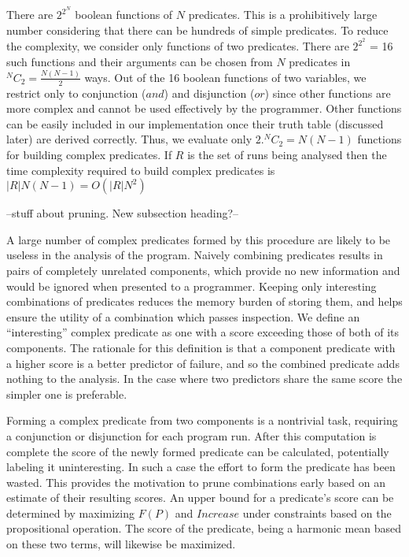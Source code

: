 There are $2^{2^N}$ boolean functions of $N$ predicates.  This is a prohibitively large number considering that there can be hundreds of simple predicates.  To reduce the complexity, we consider only functions of two predicates.  There are $2^{2^2}$ = 16 such functions and their arguments can be chosen from $N$ predicates in $^NC_2 = \frac{N(N-1)}{2}$ ways.  Out of the 16 boolean functions of two variables, we restrict only to conjunction ($and$) and disjunction ($or$) since other functions are more complex and cannot be used effectively by the programmer.  Other functions can be easily included in our implementation once their truth table (discussed later) are derived correctly.  Thus, we evaluate only $2. ^NC_2 = N(N-1)$ functions for building complex predicates.  If $R$ is the set of runs being analysed then the time complexity required to build complex predicates is $|R|N(N-1) = O(|R|N^2)$

--stuff about pruning.  New subsection heading?--

A large number of complex predicates formed by this procedure are likely to be useless in the analysis of the program.  Naively combining predicates results in pairs of completely unrelated components, which provide no new information and would be ignored when presented to a programmer.  Keeping only interesting combinations of predicates reduces the memory burden of storing them, and helps ensure the utility of a combination which passes inspection.  We define an ``interesting'' complex predicate as one with a score exceeding those of both of its components.  The rationale for this definition is that a component predicate with a higher score is a better predictor of failure, and so the combined predicate adds nothing to the analysis.  In the case where two predictors share the same score the simpler one is preferable.

Forming a complex predicate from two components is a nontrivial task, requiring a conjunction or disjunction for each program run.  After this computation is complete the score of the newly formed predicate can be calculated, potentially labeling it uninteresting.  In such a case the effort to form the predicate has been wasted.  This provides the motivation to prune combinations early based on an estimate of their resulting scores.  An upper bound for a predicate's score can be determined by maximizing $F(P)$ and $Increase$ under constraints based on the propositional operation.  The score of the predicate, being a harmonic mean based on these two terms, will likewise be maximized.

